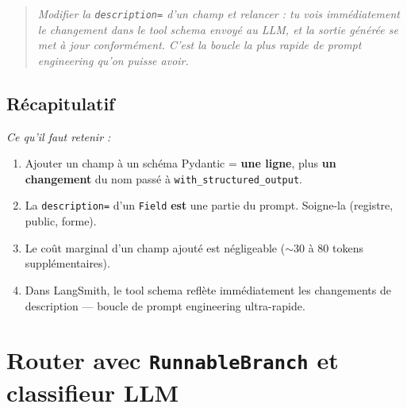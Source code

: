 \documentclass[11pt,a4paper]{article}
\begin{document}
\begin{quote}\itshape
Modifier la \texttt{description=} d'un champ et relancer : tu vois
immédiatement le changement dans le tool schema envoyé au LLM, et la
sortie générée se met à jour conformément. C'est la boucle la plus rapide
de prompt engineering qu'on puisse avoir.
\end{quote}

\subsection*{Récapitulatif}
{\itshape\sloppy
\textit{Ce qu'il faut retenir :}
\begin{enumerate}[leftmargin=*]
  \item Ajouter un champ à un schéma Pydantic = \textbf{une ligne}, plus
        \textbf{un changement} du nom passé à \texttt{with\_structured\_output}.
  \item La \texttt{description=} d'un \texttt{Field} \textbf{est} une
        partie du prompt. Soigne-la (registre, public, forme).
  \item Le coût marginal d'un champ ajouté est négligeable ($\sim$30 à
        80 tokens supplémentaires).
  \item Dans LangSmith, le tool schema reflète immédiatement les changements
        de description — boucle de prompt engineering ultra-rapide.
\end{enumerate}
\par}

\section{Router avec \texttt{RunnableBranch} et classifieur LLM}
\end{document}
